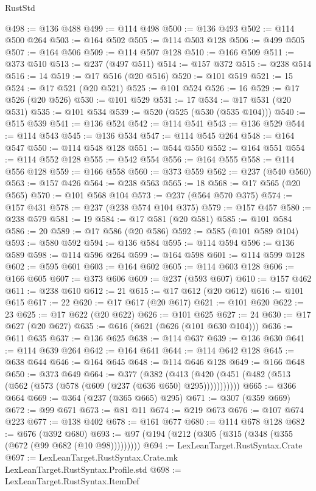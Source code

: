 \begin{lexlean}{RustStd}
\begin{coremodule}
@498 := @136 @488
@499 := @114 @498
@500 := @136 @493
@502 := @114 @500 @264
@503 := @164 @502
@505 := @114 @503 @128
@506 := @499 @505
@507 := @164 @506
@509 := @114 @507 @128
@510 := @166 @509
@511 := @373 @510
@513 := @237 (@497 @511)
@514 := @157 @372
@515 := @238 @514
@516 := 14
@519 := @17 @516 (@20 @516)
@520 := @101 @519
@521 := 15
@524 := @17 @521 (@20 @521)
@525 := @101 @524
@526 := 16
@529 := @17 @526 (@20 @526)
@530 := @101 @529
@531 := 17
@534 := @17 @531 (@20 @531)
@535 := @101 @534
@539 := @520 (@525 (@530 (@535 @104)))
@540 := @515 @539
@541 := @136 @524
@542 := @114 @541
@543 := @136 @529
@544 := @114 @543
@545 := @136 @534
@547 := @114 @545 @264
@548 := @164 @547
@550 := @114 @548 @128
@551 := @544 @550
@552 := @164 @551
@554 := @114 @552 @128
@555 := @542 @554
@556 := @164 @555
@558 := @114 @556 @128
@559 := @166 @558
@560 := @373 @559
@562 := @237 (@540 @560)
@563 := @157 @426
@564 := @238 @563
@565 := 18
@568 := @17 @565 (@20 @565)
@570 := @101 @568 @104
@573 := @237 (@564 @570 @375)
@574 := @157 @431
@578 := @237 (@238 @574 @104 @375)
@579 := @157 @457
@580 := @238 @579
@581 := 19
@584 := @17 @581 (@20 @581)
@585 := @101 @584
@586 := 20
@589 := @17 @586 (@20 @586)
@592 := @585 (@101 @589 @104)
@593 := @580 @592
@594 := @136 @584
@595 := @114 @594
@596 := @136 @589
@598 := @114 @596 @264
@599 := @164 @598
@601 := @114 @599 @128
@602 := @595 @601
@603 := @164 @602
@605 := @114 @603 @128
@606 := @166 @605
@607 := @373 @606
@609 := @237 (@593 @607)
@610 := @157 @462
@611 := @238 @610
@612 := 21
@615 := @17 @612 (@20 @612)
@616 := @101 @615
@617 := 22
@620 := @17 @617 (@20 @617)
@621 := @101 @620
@622 := 23
@625 := @17 @622 (@20 @622)
@626 := @101 @625
@627 := 24
@630 := @17 @627 (@20 @627)
@635 := @616 (@621 (@626 (@101 @630 @104)))
@636 := @611 @635
@637 := @136 @625
@638 := @114 @637
@639 := @136 @630
@641 := @114 @639 @264
@642 := @164 @641
@644 := @114 @642 @128
@645 := @638 @644
@646 := @164 @645
@648 := @114 @646 @128
@649 := @166 @648
@650 := @373 @649
@664 := @377
    (@382 (@413 (@420 (@451 (@482 (@513 (@562 (@573 (@578 (@609 (@237 (@636 @650) @295)))))))))))
@665 := @366 @664
@669 := @364 (@237 (@365 @665) @295)
@671 := @307 (@359 @669)
@672 := @99 @671
@673 := @81 @11
@674 := @219 @673
@676 := @107 @674 @223
@677 := @138 @402
@678 := @161 @677
@680 := @114 @678 @128
@682 := @676 (@392 @680)
@693 := @97 (@194 (@212 (@305 (@315 (@348 (@355 (@672 (@99 @682 (@10 @98)))))))))
@694 := LexLeanTarget.RustSyntax.Crate
@697 := LexLeanTarget.RustSyntax.Crate.mk LexLeanTarget.RustSyntax.Profile.std
@698 := LexLeanTarget.RustSyntax.ItemDef

\end{coremodule}
\end{lexlean}
